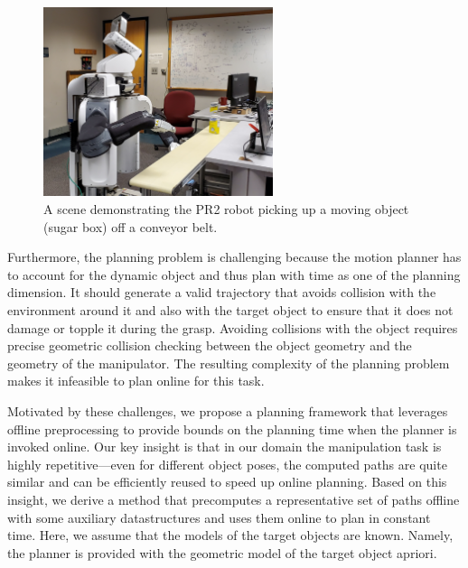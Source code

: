 \documentclass[a4paper]{report}
\begin{document}
\begin{figure}[t]
    \centering
    \includegraphics[width=0.6\textwidth]{conveyor_pr2}
    \caption{
    \CaptionTextSize
    A scene demonstrating the PR2 robot picking up a moving object (sugar box) off a conveyor belt.}
    \label{fig:intro_pic}
\end{figure}


Furthermore, the planning problem is challenging because the motion planner has to account for the dynamic object and thus plan with time as one of the planning dimension. It should generate a valid trajectory that avoids collision with the environment around it and also with the target object to ensure that it does not damage or topple it during the grasp. Avoiding collisions with the object requires precise geometric collision checking between the object geometry and the geometry of the manipulator. The resulting complexity of the planning problem makes it infeasible to plan online for this task.

Motivated by these challenges, we propose a planning framework that leverages offline preprocessing to provide bounds on the planning time when the planner is invoked online. Our key insight is that in our domain the manipulation task is highly repetitive---even for different object poses, the computed paths are quite similar and can be efficiently reused to speed up online planning. Based on this insight, we derive a method that precomputes a representative set of paths offline with some auxiliary datastructures and uses them online to plan in constant time. Here, we assume that the models of the target objects are known. Namely, the planner is provided with the geometric model of the target object apriori.
\end{document}
